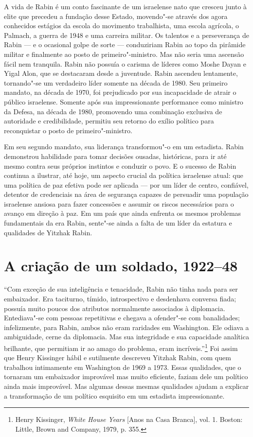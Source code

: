 A vida de Rabin é um conto fascinante de um israelense nato que cresceu
junto à elite que precedeu a fundação desse Estado, movendo"-se através dos agora
conhecidos estágios da escola do movimento trabalhista, uma escola
agrícola, o Palmach, a guerra de 1948 e uma carreira militar. Os
talentos e a perseverança de Rabin --- e o ocasional golpe de sorte ---
conduziriam Rabin ao topo da pirâmide militar e finalmente ao posto de
primeiro"-ministro. Mas não seria uma ascensão fácil nem tranquila. Rabin
não possuía o carisma de líderes como Moshe Dayan e Yigal Alon, que se
destacaram desde a juventude. Rabin ascendeu lentamente, tornando"-se um
verdadeiro líder somente na década de 1980. Seu primeiro mandato, na
década de 1970, foi prejudicado por sua incapacidade de atrair o público
israelense. Somente após sua impressionante performance como ministro da
Defesa, na década de 1980, promovendo uma combinação exclusiva de autoridade e
credibilidade, permitiu seu retorno do exílio político para
reconquistar o posto de primeiro"-ministro.

Em seu segundo mandato, sua liderança transformou"-o em um estadista.
Rabin demonstrou habilidade para tomar decisões ousadas, históricas,
para ir até mesmo contra seus próprios instintos e conduzir o povo. E o
sucesso de Rabin continua a ilustrar, até hoje, um aspecto crucial da
política israelense atual: que uma política de paz efetiva pode ser
aplicada --- por um líder de centro, confiável, detentor de credenciais
na área de segurança capazes de persuadir uma população israelense
ansiosa para fazer concessões e assumir os riscos necessários para o avanço
em direção à paz. Em um país que ainda enfrenta os mesmos problemas
fundamentais da era Rabin, sente"-se ainda a falta de um líder da
estatura e qualidades de Yitzhak Rabin.

\chapter[A criação de um soldado, 1922--48]{A criação de um soldado, 1922--48}

``Com exceção de sua inteligência e tenacidade, Rabin não tinha nada para ser
embaixador. Era taciturno, tímido, introspectivo e desdenhava
conversa fiada; possuía muito poucos dos atributos normalmente
associados à diplomacia. Entediava"-se com pessoas repetitivas e chegava
a ofender"-se com banalidades; infelizmente, para Rabin, ambos não eram
raridades em Washington. Ele odiava a ambiguidade, cerne da diplomacia.
Mas sua integridade e sua capacidade analítica brilhante, que permitiam
ir ao amago do problema, eram incríveis.''\footnote{Henry Kissinger, \textit{White House Years} {[}Anos na Casa Branca{]}, vol. 1. Boston: Little,
Brown and Company, 1979, p. 355.}
Foi assim que Henry Kissinger hábil e sutilmente descreveu Yitzhak
Rabin, com quem trabalhou intimamente em Washington de 1969 a 1973.
Essas qualidades, que o tornaram um embaixador improvável mas muito
eficiente, faziam dele um político ainda mais improvável. Mas algumas
dessas mesmas qualidades ajudam a explicar a transformação de um
político esquisito em um estadista impressionante.

